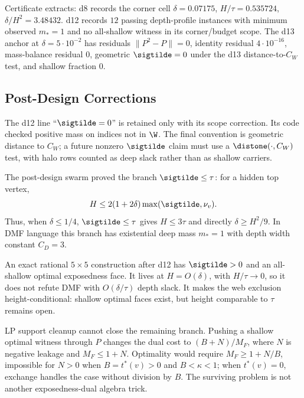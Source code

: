 \numbadge Certificate extracts: d8 records the corner cell
\(\delta=0.07175\), \(H/\tau=0.535724\), \(\delta/H^2=3.48432\).
d12 records \(12\) passing depth-profile instances with minimum observed
\(m_*=1\) and no all-shallow witness in its corner/budget scope.  The d13
anchor at \(\delta=5\cdot10^{-2}\) has residuals
\(\|P^2-P\|=0\), identity residual \(4\cdot10^{-16}\), mass-balance residual
\(0\), geometric \(\sigtilde=0\) under the d13 distance-to-\(C_W\) test, and
shallow fraction \(0\).

\subsection{Post-Design Corrections}

\begin{remark}
\modauditbadge The d12 line ``\(\sigtilde=0\)'' is retained only with its
scope correction.  Its code checked positive mass on indices not in \(\W\).
The final convention is geometric distance to \(C_W\); a future nonzero
\(\sigtilde\) claim must use a \(\distone(\cdot,C_W)\) test, with halo rows
counted as deep slack rather than as shallow carriers.
\end{remark}

\begin{remark}
\provedbadge The post-design swarm proved the branch
\(\sigtilde\le\tau\): for a hidden top vertex,
\[
  H\le 2(1+2\delta)\max(\sigtilde,\nu_v).
\]
Thus, when \(\delta\le1/4\), \(\sigtilde\le\tau\) gives \(H\le3\tau\) and
directly \(\delta\ge H^2/9\).  In DMF language this branch has existential
deep mass \(m_*=1\) with depth width constant \(C_D=3\).
\end{remark}

\begin{remark}
\modauditbadge An exact rational \(5\times5\) construction after d12 has
\(\sigtilde>0\) and an all-shallow optimal exposedness face.  It lives at
\(H=O(\delta)\), with \(H/\tau\to0\), so it does not refute DMF with
\(O(\delta/\tau)\) depth slack.  It makes the web exclusion height-conditional:
shallow optimal faces exist, but height comparable to \(\tau\) remains open.
\end{remark}

\begin{remark}
\provedbadge LP support cleanup cannot close the remaining branch.  Pushing a
shallow optimal witness through \(P\) changes the dual cost to
\((B+N)/M_F\), where \(N\) is negative leakage and \(M_F\le1+N\).  Optimality
would require \(M_F\ge1+N/B\), impossible for \(N>0\) when \(B=t^*(v)>0\) and
\(B<\kappa<1\); when \(t^*(v)=0\), exchange handles the case without division
by \(B\).  The surviving problem is not another exposedness-dual algebra trick.
\end{remark}

